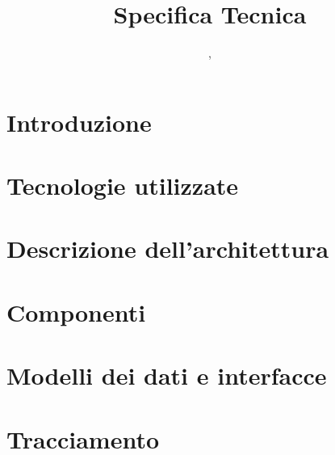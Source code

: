 


\author{\GG, \MM}
\supervisor{\LB, \AZ}
\dest{\ALL}
\title{Specifica Tecnica}


\maketitle

\tableofcontents
\newpage



\section{Introduzione}


\section{Tecnologie utilizzate}


\section{Descrizione dell'architettura}


\section{Componenti}


\section{Modelli dei dati e interfacce}


% 

\section{Tracciamento}





